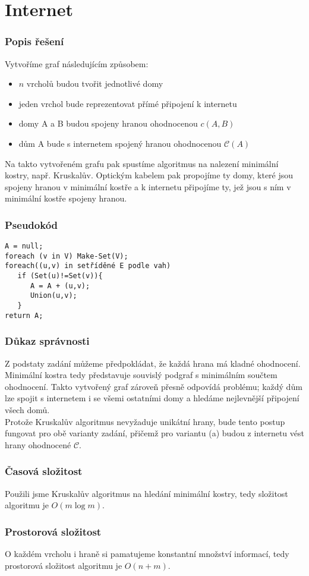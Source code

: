 \documentclass[11pt,a4paper]{article}
\begin{document}
\part*{Internet}
\section{Popis řešení}
Vytvoříme graf následujícím způsobem:
\begin{itemize}
\item 
$n$ vrcholů budou tvořit jednotlivé domy
\item
jeden vrchol bude reprezentovat přímé připojení k internetu
\item
domy A a B budou spojeny hranou ohodnocenou $c(A, B)$
\item
dům A bude s internetem spojený hranou ohodnocenou $\mathcal{C}(A)$
\end{itemize}

Na takto vytvořeném grafu pak spustíme algoritmus na nalezení minimální kostry, např. Kruskalův. Optickým kabelem pak propojíme ty domy, které jsou spojeny hranou v minimální kostře a k internetu připojíme ty, jež jsou s ním v minimální kostře spojeny hranou. 
\section{Pseudokód}
\begin{verbatim}
A = null;
foreach (v in V) Make-Set(V);
foreach((u,v) in setříděné E podle vah)
   if (Set(u)!=Set(v)){
      A = A + (u,v);
      Union(u,v);
   }
return A;
\end{verbatim}
\section{Důkaz správnosti}
Z podstaty zadání můžeme předpokládat, že každá hrana má kladné ohodnocení. Minimální kostra tedy představuje souvislý podgraf s minimálním součtem ohodnocení. Takto vytvořený graf zároveň přesně odpovídá problému; každý dům lze spojit s internetem i se všemi ostatními domy a hledáme nejlevnější připojení všech domů.\\

Protože Kruskalův algoritmus nevyžaduje unikátní hrany, bude tento postup fungovat pro obě varianty zadání, přičemž pro variantu (a) budou z internetu vést hrany ohodnocené $\mathcal{C}$. 
\section{Časová složitost}
Použili jsme Kruskalův algoritmus na hledání minimální kostry, tedy složitost algoritmu je $O(m \log m)$.
\section{Prostorová složitost}
O každém vrcholu i hraně si pamatujeme konstantní množství informací, tedy prostorová složitost algoritmu je $O(n+m)$.
\end{document}
